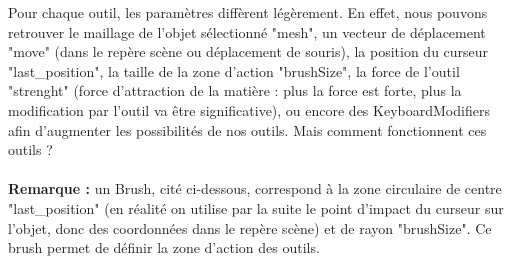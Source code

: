 \documentclass[a4paper]{memoir}
\begin{document}
					Pour chaque outil, les paramètres diffèrent légèrement. En effet, nous pouvons retrouver le maillage de l'objet sélectionné "mesh",  un 
					vecteur de déplacement "move" (dans le repère scène ou déplacement de souris), la position du curseur "last\_position", la taille de la 
					zone d'action "brushSize", la force de l'outil "strenght" (force d'attraction de la matière : plus la force est forte, plus la 
					modification par l'outil va être significative), ou encore des KeyboardModifiers afin d'augmenter les possibilités de nos outils. 
					Mais comment fonctionnent ces outils ?\\\\
					\textbf{Remarque :} un Brush, cité ci-dessous, correspond à la zone circulaire de centre "last\_position" (en réalité on utilise par la 
					suite le point d'impact du curseur sur l'objet, donc des coordonnées dans le repère scène) et de rayon "brushSize". Ce brush permet de 
					définir la zone d'action des outils.
\end{document}
